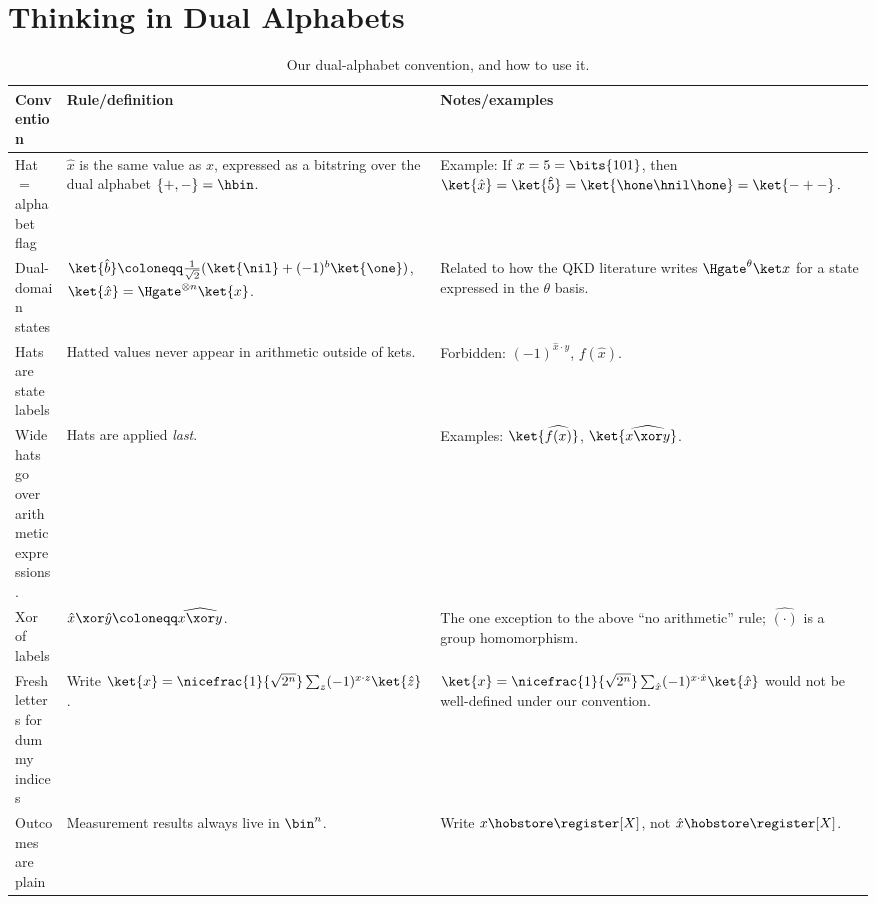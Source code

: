 \section{Thinking in Dual Alphabets}\label{sec:dual}
  \begin{table}[b!]
    \centering
    \caption{
      \label{tab:dual-conventions}
      Our dual-alphabet convention, and how to use it.
    }
    {\setlength{\tabcolsep}{6pt}
    \begin{tabularx}{\textwidth}{XXX}
      \toprule
      \textbf{Convention} & \textbf{Rule/definition} & \textbf{Notes/examples} \\
      \midrule
      Hat $=$ alphabet flag 
        & $\hat{x}$ is the same value as $x$, expressed as a 
          bitstring over the dual alphabet $\{+,-\} = \hbin$.
        & Example: If $x = 5 = \bits{101}$, then 
          $\ket{\hat{x}} = \ket{\hat{5}}
          = \ket{\hone \hnil \hone} = \ket{-+-}\, .$ \\
      Dual-domain states 
        & $\ket{\hat{b}} \coloneqq \frac{1}{\sqrt 2} (\ket{\nil} + (-1)^b \ket{\one})$,
          $\ket{\hat{x}} = \Hgate^{\otimes n} \ket{x}$.
        & Related to how the QKD literature writes $\Hgate^\theta \ket x$ for a state
          expressed in the $\theta$ basis. \\
      Hats are state labels
        & Hatted values never appear in arithmetic outside of kets.
        & Forbidden: $(-1)^{\hat{x} \cdot y}$, $f(\hat{x})$. \\
      Wide hats go over arithmetic expressions.
        & Hats are applied \emph{last}.
        & Examples: $\ket{\widehat{f(x)}}$, $\ket{\widehat{x \xor y}}$. \\
      Xor of labels
        & $\hat{x} \xor \hat{y} \coloneqq \widehat{x \xor y}$.
        & The one exception to the above ``no
          arithmetic'' rule; $\widehat{(\cdot)}$ is a group homomorphism. \\
      Fresh letters for dummy indices
        & Write $\ket{x} = \nicefrac{1}{\sqrt{2^n}} \sum_z (-1)^{x \cdot z} \ket{\hat z}$.
        & $\ket{x} = \nicefrac{1}{\sqrt{2^n}} \sum_{\hat{x}} (-1)^{x \cdot \hat{x}} \ket{\hat x}$ 
          would not be well-defined under our convention. \\
      Outcomes are plain
        & Measurement results always live in $\bin^n$.
        & Write $x \hobstore \register[X]$, not $\hat x \hobstore \register[X]$. \\
      \bottomrule
    \end{tabularx}}
  \end{table}

